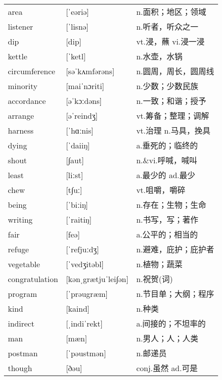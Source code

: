 \documentclass[a4paper]{article}
\begin{document}
\section{}
\begin{tabular}{l l l}

area & [ˈeəriə] & n.面积；地区；领域 \\
listener & [ˈlisnə] & n.听者，听众之一 \\
dip & [dip] & vt.浸，蘸 vi.浸一浸 \\
kettle & [ˈketl] & n.水壶，水锅 \\
circumference & [səˈkʌmfərəns] & n.圆周，周长，圆周线 \\
minority & [maiˈnɔriti] & n.少数；少数民族 \\
accordance & [əˈkɔːdəns] & n.一致；和谐；授予 \\
arrange & [əˈreindʒ] & vt.筹备；整理；调解 \\
harness & [ˈhɑːnis] & vt.治理 n.马具，挽具 \\
dying & [ˈdaiiŋ] & a.垂死的；临终的 \\
shout & [∫aut] & n.\&vi.呼喊，喊叫 \\
least & [liːst] & a.最少的 ad.最少 \\
chew & [t∫uː] & vt.咀嚼，嚼碎 \\
being & [ˈbiːiŋ] & n.存在；生物；生命 \\
writing & [ˈraitiŋ] & n.书写，写；著作 \\
fair & [feə] & a.公平的；相当的 \\
refuge & [ˈrefjuːdʒ] & n.避难，庇护；庇护者 \\
vegetable & [ˈvedʒitəbl] & n.植物；蔬菜 \\
congratulation & [kənˌgrætjuˈlei∫ən] & n.祝贺(词) \\
program & [ˈprəugræm] & n.节目单；大纲；程序 \\
kind & [kaind] & n.种类 \\
indirect & [ˌindiˈrekt] & a.间接的；不坦率的 \\
man & [mæn] & n.男人；人；人类 \\
postman & [ˈpəustmən] & n.邮递员 \\
though & [ðəu] & conj.虽然 ad.可是 \\

\end{tabular}
\end{document}
